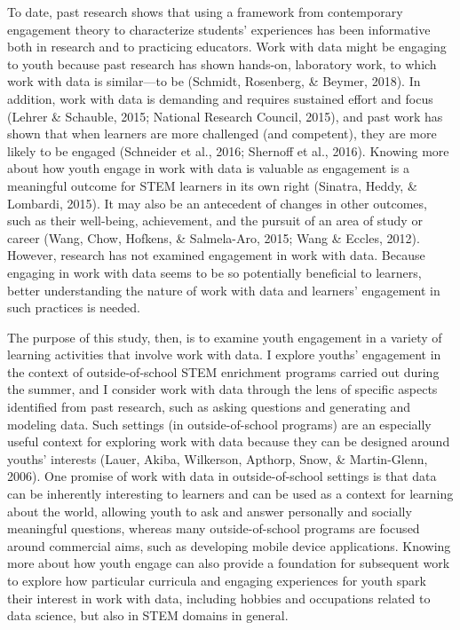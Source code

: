 \documentclass[]{msu-thesis}
\theoremstyle{definition}
\theoremstyle{definition}
\theoremstyle{definition}
\theoremstyle{remark}
\begin{document}
To date, past research shows that using a framework from contemporary
engagement theory to characterize students' experiences has been
informative both in research and to practicing educators. Work with data
might be engaging to youth because past research has shown hands-on,
laboratory work, to which work with data is similar---to be (Schmidt,
Rosenberg, \& Beymer, 2018). In addition, work with data is demanding
and requires sustained effort and focus (Lehrer \& Schauble, 2015;
National Research Council, 2015), and past work has shown that when
learners are more challenged (and competent), they are more likely to be
engaged (Schneider et al., 2016; Shernoff et al., 2016). Knowing more
about how youth engage in work with data is valuable as engagement is a
meaningful outcome for STEM learners in its own right (Sinatra, Heddy,
\& Lombardi, 2015). It may also be an antecedent of changes in other
outcomes, such as their well-being, achievement, and the pursuit of an
area of study or career (Wang, Chow, Hofkens, \& Salmela-Aro, 2015; Wang
\& Eccles, 2012). However, research has not examined engagement in work
with data. Because engaging in work with data seems to be so potentially
beneficial to learners, better understanding the nature of work with
data and learners' engagement in such practices is needed.

The purpose of this study, then, is to examine youth engagement in a
variety of learning activities that involve work with data. I explore
youths' engagement in the context of outside-of-school STEM enrichment
programs carried out during the summer, and I consider work with data
through the lens of specific aspects identified from past research, such
as asking questions and generating and modeling data. Such settings (in
outside-of-school programs) are an especially useful context for
exploring work with data because they can be designed around youths'
interests (Lauer, Akiba, Wilkerson, Apthorp, Snow, \& Martin-Glenn,
2006). One promise of work with data in outside-of-school settings is
that data can be inherently interesting to learners and can be used as a
context for learning about the world, allowing youth to ask and answer
personally and socially meaningful questions, whereas many
outside-of-school programs are focused around commercial aims, such as
developing mobile device applications. Knowing more about how youth
engage can also provide a foundation for subsequent work to explore how
particular curricula and engaging experiences for youth spark their
interest in work with data, including hobbies and occupations related to
data science, but also in STEM domains in general.
\end{document}

